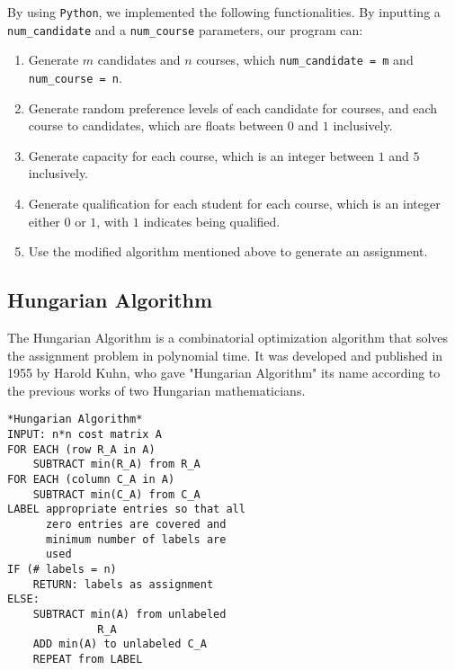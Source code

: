 \documentclass[twoside,twocolumn]{article}
\begin{document}
    By using \verb|Python|, we implemented the following functionalities. 
    By inputting a \verb|num_candidate| and a \verb|num_course| parameters, our program can:
    \begin{enumerate}
        \item Generate $m$ candidates and $n$ courses, which \verb|num_candidate = m| and \verb|num_course = n|.
        \item Generate random preference levels of each candidate for courses, and each course to candidates, which are
        floats between $0$ and $1$ inclusively.
        \item Generate capacity for each course, which is an integer between $1$ and $5$ inclusively.
        \item Generate qualification for each student for each course, which is an integer either $0$ or $1$, with $1$ indicates
        being qualified.
        \item Use the modified algorithm mentioned above to generate an assignment.
    \end{enumerate}

    \subsection{Hungarian Algorithm}
    The Hungarian Algorithm is a combinatorial optimization algorithm that solves the assignment problem in polynomial time.
    It was developed and published in 1955 by Harold Kuhn, who gave "Hungarian Algorithm" its name according to the previous works
    of two Hungarian mathematicians.
    \begin{lstlisting}
*Hungarian Algorithm*
INPUT: n*n cost matrix A
FOR EACH (row R_A in A)
    SUBTRACT min(R_A) from R_A
FOR EACH (column C_A in A)
    SUBTRACT min(C_A) from C_A
LABEL appropriate entries so that all
      zero entries are covered and 
      minimum number of labels are 
      used
IF (# labels = n)
    RETURN: labels as assignment    
ELSE:
    SUBTRACT min(A) from unlabeled 
              R_A
    ADD min(A) to unlabeled C_A
    REPEAT from LABEL
    \end{lstlisting}
\end{document}
